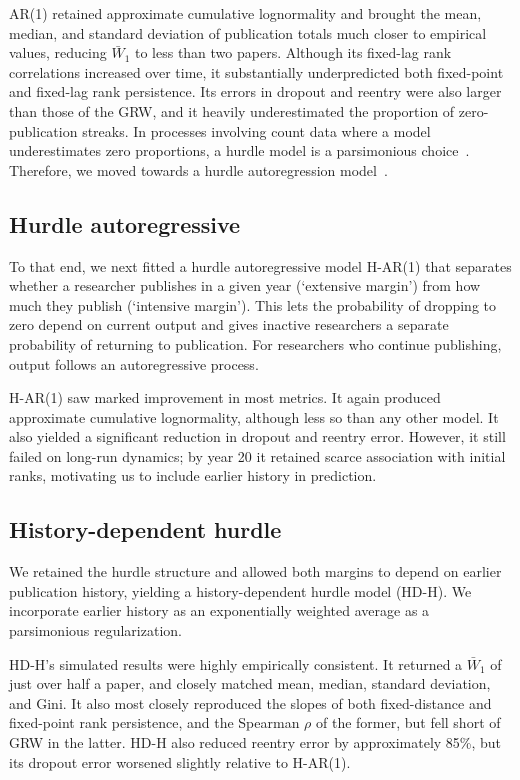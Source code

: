 \documentclass[9pt,twocolumn,twoside]{pnas-new}
\begin{document}
AR(1) retained approximate cumulative lognormality and brought the mean, median, and standard deviation of publication totals much closer to empirical values, reducing $\bar{W}_1$ to less than two papers. Although its fixed-lag rank correlations increased over time, it substantially underpredicted both fixed-point and fixed-lag rank persistence. Its errors in dropout and reentry were also larger than those of the GRW, and it heavily underestimated the proportion of zero-publication streaks. In processes involving count data where a model underestimates zero proportions, a hurdle model is a parsimonious choice~\cite{longitudinal_zero_and_positive_outcomes_farewell2017}. Therefore, we moved towards a hurdle autoregression model~\cite{bacciniCrossingHurdleDeterminants2014}.

\subsection*{Hurdle autoregressive}\label{subsec:model_hurdleAR}

To that end, we next fitted a hurdle autoregressive model H-AR(1) that separates whether a researcher publishes in a given year (`extensive margin') from how much they publish (`intensive margin'). This lets the probability of dropping to zero depend on current output and gives inactive researchers a separate probability of returning to publication. For researchers who continue publishing, output follows an autoregressive process. 

H-AR(1) saw marked improvement in most metrics. It again produced approximate cumulative lognormality, although less so than any other model. It also yielded a significant reduction in dropout and reentry error. However, it still failed on long-run dynamics; by year 20 it retained scarce association with initial ranks, motivating us to include earlier history in prediction. 

\subsection*{History-dependent hurdle}\label{subsec:model_SE}

We retained the hurdle structure and allowed both margins to depend on earlier publication history, yielding a history-dependent hurdle model (HD-H). We incorporate earlier history as an exponentially weighted average as a parsimonious regularization.

HD-H's simulated results were highly empirically consistent. It returned a $\bar{W}_1$ of just over half a paper, and closely matched mean, median, standard deviation, and Gini. It also most closely reproduced the slopes of both fixed-distance and fixed-point rank persistence, and the Spearman $\rho$ of the former, but fell short of GRW in the latter. HD-H also reduced reentry error by approximately 85\%, but its dropout error worsened slightly relative to H-AR(1).
\end{document}
